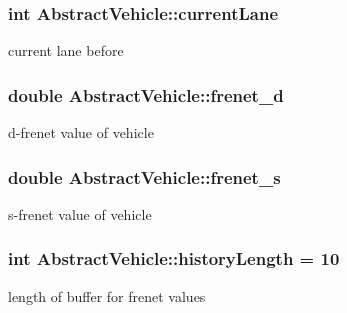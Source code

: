 \subsubsection[{\texorpdfstring{current\+Lane}{currentLane}}]{\setlength{\rightskip}{0pt plus 5cm}int Abstract\+Vehicle\+::current\+Lane\hspace{0.3cm}{\ttfamily [protected]}}\hypertarget{classAbstractVehicle_aa0a52d60f51e34c045db63ecc4a96f98}{}\label{classAbstractVehicle_aa0a52d60f51e34c045db63ecc4a96f98}
current lane before 
\subsubsection[{\texorpdfstring{frenet\+\_\+d}{frenet_d}}]{\setlength{\rightskip}{0pt plus 5cm}double Abstract\+Vehicle\+::frenet\+\_\+d\hspace{0.3cm}{\ttfamily [protected]}}\hypertarget{classAbstractVehicle_a6a98d1a83288b4c7c7d70b09f606e648}{}\label{classAbstractVehicle_a6a98d1a83288b4c7c7d70b09f606e648}
d-\/frenet value of vehicle 
\subsubsection[{\texorpdfstring{frenet\+\_\+s}{frenet_s}}]{\setlength{\rightskip}{0pt plus 5cm}double Abstract\+Vehicle\+::frenet\+\_\+s\hspace{0.3cm}{\ttfamily [protected]}}\hypertarget{classAbstractVehicle_a8fe56b85f2acffbbb5e451b99f4883b4}{}\label{classAbstractVehicle_a8fe56b85f2acffbbb5e451b99f4883b4}
s-\/frenet value of vehicle 
\subsubsection[{\texorpdfstring{history\+Length}{historyLength}}]{\setlength{\rightskip}{0pt plus 5cm}int Abstract\+Vehicle\+::history\+Length = 10\hspace{0.3cm}{\ttfamily [protected]}}\hypertarget{classAbstractVehicle_a5cf60337402a5d6457229e186a403dc5}{}\label{classAbstractVehicle_a5cf60337402a5d6457229e186a403dc5}
length of buffer for frenet values 
